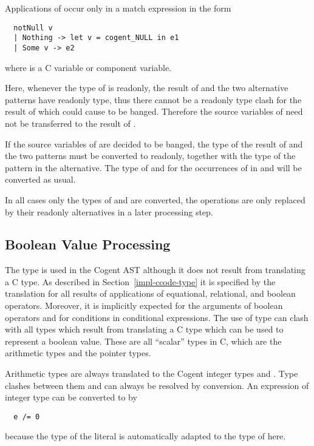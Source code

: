 Applications of  occur only in a match expression in the form
\begin{verbatim}
  notNull v
  | Nothing -> let v = cogent_NULL in e1
  | Some v -> e2
\end{verbatim}
where  is a C variable or component variable.

Here, whenever the type of  is readonly, the result of  and the two alternative patterns have readonly type,
thus there cannot be a readonly type clash for the result of  which could cause  to be banged. Therefore
the source variables of  need not be transferred to the result of .

If the source variables of  are decided to be banged, the type of the result of  and the two patterns must
be converted to readonly, together with the type of the  pattern in the  alternative. The type of
 and for the occurrences of  in  and  will be converted as usual.

In all cases only the types of  and  are converted, the operations are only replaced by their readonly
alternatives in a later processing step.

\subsection{Boolean Value Processing}
\label{impl-post-bool}

The type  is used in the Cogent AST although it does not result from translating a C type. As described in
Section~\ref{impl-ccode-type} it is specified by the translation for all results of applications of equational, relational,
and boolean operators. Moreover, it is implicitly expected for the arguments of boolean operators and for conditions in conditional
expressions. The use of type  can clash with all types which result from translating a C type which can be used to
represent a boolean value. These are all ``scalar'' types in C, which are the arithmetic types and the pointer types.

Arithmetic types are always translated to the Cogent integer types  and . Type clashes between
them and  can always be resolved by conversion. An expression  of integer type can be converted
to  by
\begin{verbatim}
  e /= 0
\end{verbatim}
because the type of the literal  is automatically adapted to the type of  here.

